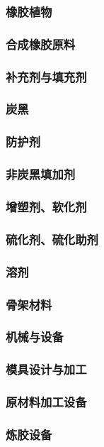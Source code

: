\documentclass[UTF8]{../../ApplicationUniverse}
\begin{document}
        \subsubsection{橡胶植物}
        \subsubsection{合成橡胶原料}
        \subsubsection{补充剂与填充剂}
            \subsubsection{炭黑}
            \subsubsection{防护剂}
            \subsubsection{非炭黑填加剂}
            \subsubsection{增塑剂、软化剂}
            \subsubsection{硫化剂、硫化助剂}
            \subsubsection{溶剂}
            \subsubsection{骨架材料}
    \subsubsection{机械与设备}
        \subsubsection{模具设计与加工}
        \subsubsection{原材料加工设备}
        \subsubsection{炼胶设备}
\end{document}
